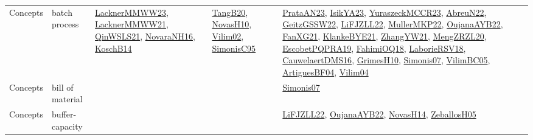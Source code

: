 {\begin{longtable}{lp{3cm}>{\raggedright}p{6cm}>{\raggedright}p{6cm}p{8cm}}
Concepts & batch process & \href{articles/LacknerMMWW23.pdf}{LacknerMMWW23}\cite{LacknerMMWW23}, \href{papers/LacknerMMWW21.pdf}{LacknerMMWW21}\cite{LacknerMMWW21}, \href{articles/QinWSLS21.pdf}{QinWSLS21}\cite{QinWSLS21}, \href{articles/NovaraNH16.pdf}{NovaraNH16}\cite{NovaraNH16}, \href{papers/KoschB14.pdf}{KoschB14}\cite{KoschB14} & \href{papers/TangB20.pdf}{TangB20}\cite{TangB20}, \href{articles/NovasH10.pdf}{NovasH10}\cite{NovasH10}, \href{papers/Vilim02.pdf}{Vilim02}\cite{Vilim02}, \href{papers/SimonisC95.pdf}{SimonisC95}\cite{SimonisC95} & \href{articles/PrataAN23.pdf}{PrataAN23}\cite{PrataAN23}, \href{articles/IsikYA23.pdf}{IsikYA23}\cite{IsikYA23}, \href{articles/YuraszeckMCCR23.pdf}{YuraszeckMCCR23}\cite{YuraszeckMCCR23}, \href{articles/AbreuN22.pdf}{AbreuN22}\cite{AbreuN22}, \href{papers/GeitzGSSW22.pdf}{GeitzGSSW22}\cite{GeitzGSSW22}, \href{papers/LiFJZLL22.pdf}{LiFJZLL22}\cite{LiFJZLL22}, \href{articles/MullerMKP22.pdf}{MullerMKP22}\cite{MullerMKP22}, \href{papers/OujanaAYB22.pdf}{OujanaAYB22}\cite{OujanaAYB22}, \href{articles/FanXG21.pdf}{FanXG21}\cite{FanXG21}, \href{papers/KlankeBYE21.pdf}{KlankeBYE21}\cite{KlankeBYE21}, \href{articles/ZhangYW21.pdf}{ZhangYW21}\cite{ZhangYW21}, \href{articles/MengZRZL20.pdf}{MengZRZL20}\cite{MengZRZL20}, \href{articles/EscobetPQPRA19.pdf}{EscobetPQPRA19}\cite{EscobetPQPRA19}, \href{articles/FahimiOQ18.pdf}{FahimiOQ18}\cite{FahimiOQ18}, \href{articles/LaborieRSV18.pdf}{LaborieRSV18}\cite{LaborieRSV18}, \href{papers/CauwelaertDMS16.pdf}{CauwelaertDMS16}\cite{CauwelaertDMS16}, \href{papers/GrimesH10.pdf}{GrimesH10}\cite{GrimesH10}, \href{articles/Simonis07.pdf}{Simonis07}\cite{Simonis07}, \href{articles/VilimBC05.pdf}{VilimBC05}\cite{VilimBC05}, \href{papers/ArtiguesBF04.pdf}{ArtiguesBF04}\cite{ArtiguesBF04}, \href{papers/Vilim04.pdf}{Vilim04}\cite{Vilim04}\\
Concepts & bill of material &  &  & \href{articles/Simonis07.pdf}{Simonis07}\cite{Simonis07}\\
Concepts & buffer-capacity &  &  & \href{papers/LiFJZLL22.pdf}{LiFJZLL22}\cite{LiFJZLL22}, \href{papers/OujanaAYB22.pdf}{OujanaAYB22}\cite{OujanaAYB22}, \href{articles/NovasH14.pdf}{NovasH14}\cite{NovasH14}, \href{articles/ZeballosH05.pdf}{ZeballosH05}\cite{ZeballosH05}\\

\end{longtable}}
